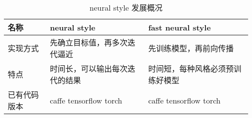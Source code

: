 \begin{table}[H]
\centering
\begin{tabular}{lll}
\toprule
  名称     & neural style\cite{neural-style}    & fast neural style\cite{fast-neural-style-tensorflow} \\
\midrule
实现方式   & 先确立目标值，再多次迭代逼近  & 先训练模型，再前向传播       \\
特点     & 时间长，可以输出每次迭代的结果 & 时间短，每种风格必须预训练好模型  \\
  已有代码版本 &caffe tensorflow torch & caffe tensorflow torch \\
\bottomrule
\end{tabular}
\caption{neural style 发展概况}
\label{tbl:compare-neural-style}
\end{table}
